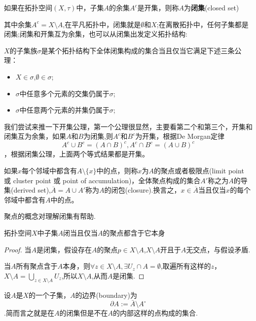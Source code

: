 \begin{definition}
如果在拓扑空间$(X,\tau)$中，子集$A$的余集$A^{c}$是开集，则称$A$为\textbf{闭集}(closed set)
\end{definition}

其中余集$A^{c}= X \setminus A$,在平凡拓扑中，闭集就是$\emptyset$和$X$;在离散拓扑中，任何子集都是闭集;闭集和开集互为余集，也可以从闭集出发定义拓扑结构:

\begin{definition}
$X$的子集族$\sigma$是某个拓扑结构下全体闭集构成的集合当且仅当它满足下述三条公理：
\begin{itemize}
	\item $X \in \sigma$,$\emptyset \in \sigma$;
	\item $\sigma$中任意多个元素的交集仍属于$\sigma$;
	\item $\sigma$中任意两个元素的并集仍属于$\sigma$;
\end{itemize}
\end{definition}

我们尝试来推一下开集公理，第一个公理很显然，主要看第二个和第三个，开集和闭集互为余集，如果$A$和$B$为闭集,则$A^c$和$B^c$为开集，根据De Morgan定律\[A^c \cup B^c = (A \cap B)^c , A^c \cap B^c = (A \cup B)^c\]，根据闭集公理，上面两个等式结果都是开集。

\begin{definition}
如果$x$每个邻域中都含有$A \setminus \{x\}$中的点，则称$x$为$A$的聚点或者极限点(limit point 或 cluster point 或 point of accumulation)，全体聚点构成的集合$A'$称之为$A$的导集(derived set),$\overline{A}=A \cup A'$称为$A$的闭包(closure).换言之，$x \in \overline{A}$当且仅当$x$的每个邻域中都含有$A$中的点。
\end{definition}

聚点的概念对理解闭集有帮助.

\begin{proposition}
拓扑空间$X$中子集$A$闭当且仅当$A$的聚点都含于它本身
\end{proposition}


\begin{proof}
当$A$是闭集，假设存在$A$的聚点$p \in X \setminus A$,$X \setminus A$开且于$A$无交点，与假设矛盾.

当$A$所有聚点含于$A$本身，则$\forall z \in X \setminus A, \exists U_z \cap A = \emptyset$,取遍所有这样的$z$，$X \setminus A=\bigcup\limits_{z \in X \setminus A } U_z$,所以$X \setminus A$,从而$A$是闭集.
\end{proof}

\begin{definition}
设$A$是$X$的一个子集，$A$的边界(\rm boundary)为\[ \partial A:={\bar {A}}\setminus A^{\circ }\].简而言之就是在$A$的闭集但是不在$A$的内部这样的点构成的集合.
\end{definition}


